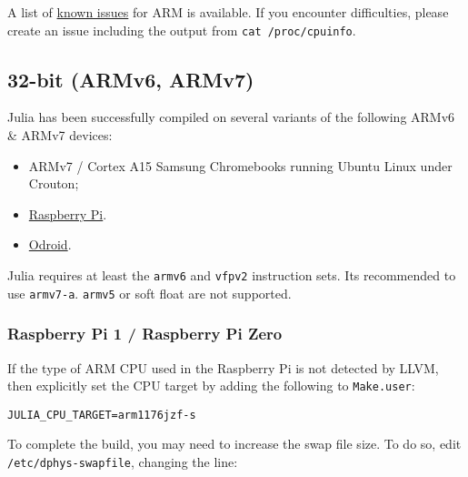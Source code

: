 A list of \href{https://github.com/JuliaLang/julia/labels/arm}{known issues} for ARM is available. If you encounter difficulties, please create an issue including the output from \texttt{cat /proc/cpuinfo}.



\hypertarget{6625901791414385042}{}


\subsection{32-bit (ARMv6, ARMv7)}



Julia has been successfully compiled on several variants of the following ARMv6 \& ARMv7 devices:



\begin{itemize}
\item ARMv7 / Cortex A15 Samsung Chromebooks running Ubuntu Linux under Crouton;


\item \href{https://www.raspberrypi.org}{Raspberry Pi}.


\item \href{https://www.hardkernel.com}{Odroid}.

\end{itemize}


Julia requires at least the \texttt{armv6} and \texttt{vfpv2} instruction sets. It{\textquotesingle}s recommended to use  \texttt{armv7-a}. \texttt{armv5} or soft float are not supported.



\hypertarget{10466379612209245112}{}


\subsubsection{Raspberry Pi 1 / Raspberry Pi Zero}



If the type of ARM CPU used in the Raspberry Pi is not detected by LLVM, then explicitly set the CPU target by adding the following to \texttt{Make.user}:




\begin{lstlisting}
JULIA_CPU_TARGET=arm1176jzf-s
\end{lstlisting}



To complete the build, you may need to increase the swap file size. To do so, edit \texttt{/etc/dphys-swapfile}, changing the line:




